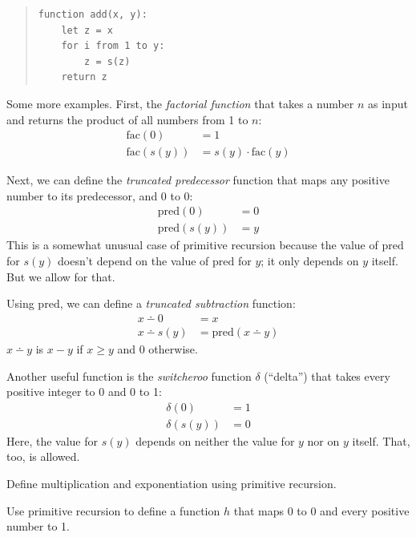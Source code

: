 \begin{quote}\small
\begin{verbatim}
function add(x, y):
    let z = x
    for i from 1 to y:
        z = s(z)
    return z
\end{verbatim}
\end{quote}

Some more examples.
First, the \emph{factorial function} that takes
a number $n$ as input and returns the product of all numbers from 1 to $n$:
\begin{align*}
  \mathrm{fac}(0) &= 1\\
  \mathrm{fac}(s(y)) &= s(y) \cdot \mathrm{fac}(y)
\end{align*}

Next,
we can define the \emph{truncated predecessor} function that
maps any positive number to its predecessor,
and 0 to 0:
\begin{align*}
  \mathrm{pred}(0) &= 0\\
  \mathrm{pred}(s(y)) &= y
\end{align*}
\noindent%
This is a somewhat unusual case of primitive recursion
because the value of $\mathrm{pred}$ for $s(y)$ doesn't depend on the value of $\mathrm{pred}$ for $y$;
it only depends on $y$ itself.
But we allow for that.

Using $\mathrm{pred}$,
we can define a \emph{truncated subtraction} function:
\begin{align*}
  x \dotminus 0 &= x\\
  x \dotminus s(y) &= \mathrm{pred}(x \dotminus y)
\end{align*}
%
\noindent%
$x \dotminus y$ is $x-y$ if $x \geq y$
and 0 otherwise.

Another useful function is the \textit{switcheroo} function $\delta$ (``delta'') that
takes every positive integer to 0 and 0 to 1:
\begin{align*}
  \delta(0) &= 1\\
  \delta(s(y)) &= 0
\end{align*}
Here, the value for $s(y)$ depends on neither the value for $y$ nor on $y$ itself.
That, too, is allowed.

\begin{exercise}
  Define multiplication and exponentiation using primitive recursion.
\end{exercise}

\begin{exercise}
  Use primitive recursion to define a function $h$
  that maps 0 to 0 and every positive number to 1.  
\end{exercise}

